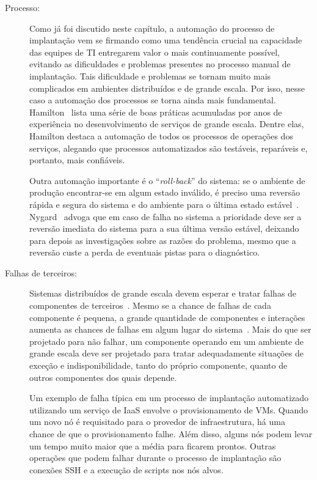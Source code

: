 \begin{description}

\item [Processo:]

Como já foi discutido neste capítulo, a automação do processo de implantação
vem se firmando como uma tendência crucial na capacidade
das equipes de TI entregarem valor o mais continuamente possível,
evitando as dificuldades e problemas presentes no processo manual de implantação.
Tais dificuldade e problemas se tornam muito mais complicados em ambientes distribuídos
e de grande escala. Por isso, nesse caso a automação dos processos se torna
ainda mais fundamental.
Hamilton~\cite{Hamilton2007InternetScale} lista uma série de boas práticas acumuladas 
por anos de experiência no desenvolvimento de serviços de grande escala.
Dentre elas, Hamilton destaca a automação de todos os processos de operações dos serviços,
alegando que processos automatizados são testáveis, reparáveis e, portanto,
mais confiáveis.

Outra automação importante é o ``\emph{roll-back}'' do sistema: se o ambiente de produção encontrar-se em algum estado inválido, é preciso uma reversão rápida e segura do sistema e do ambiente para o última estado estável~\cite{Hamilton2007InternetScale, Brewer2001GiantScale}. Nygard~\cite{Nygard2009Release} advoga que em caso de falha no sistema a prioridade deve ser a reversão imediata do sistema para a sua última versão estável, deixando para depois as investigações sobre as razões do problema, mesmo que a reversão custe a perda de eventuais pistas para o diagnóstico. 

\item [Falhas de terceiros:] 

Sistemas distribuídos de grande escala devem esperar e tratar falhas
de componentes de terceiros~\cite{Hamilton2007InternetScale,Helland2009Quicksand,CarnegieMellon2006ULS}.
Mesmo se a chance de falhas de cada componente é pequena,
a grande quantidade de componentes e interações aumenta as chances de 
falhas em algum lugar do sistema~\cite{CarnegieMellon2006ULS}.
Mais do que ser projetado para não falhar, um componente operando em um ambiente  de grande escala deve ser projetado para tratar adequadamente situações de exceção e indisponibilidade, tanto do próprio componente, quanto de outros componentes dos quais depende.

Um exemplo de falha típica em um processo de implantação automatizado
utilizando um serviço de IaaS envolve o provisionamento de VMs.
Quando um novo nó é requisitado para o provedor de infraestrutura,
há uma chance de que o provisionamento falhe.
Além disso, alguns nós podem levar um tempo muito maior que a média para ficarem prontos.
Outras operações que podem falhar durante o processo de implantação são
conexões SSH e a execução de scripts nos nós alvos.


\end{description}
